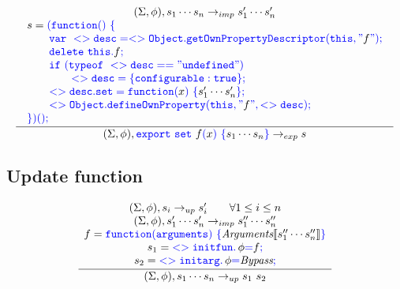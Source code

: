 \documentclass[a4paper]{article}
\newcommand{\code}[1]{\textcolor{blue}{\tt #1}}
\newcommand{\mydot}{.\,}
\begin{document}
\begin{equation*}
\frac{
    \begin{array}{c}
    (\Sigma, \phi), s_1 \cdots s_n \rightarrow_{imp} s'_1 \cdots s'_n \\
    \begin{array}{l}
    s = \code{(} \code{function()}\ \code{\{} \\
    \qquad \code{var\ <>desc = <>Object.getOwnPropertyDescriptor(this, "}f\code{");} \\
    \qquad \code{delete\ this.}f\code{;} \\
    \qquad \code{if\ (typeof\ <>desc == "undefined")} \\
    \qquad\qquad \code{<>desc = \{ configurable: true \};} \\
    \qquad \code{<>desc.set = function(}x\code{)}\ \code{\{} s'_1 \cdots s'_n \code{\};} \\
    \qquad \code{<>Object.defineOwnProperty(this, "}f\code{", <>desc);} \\
    \code{\}} \code{)} \code{();} \\
    \end{array} \\
    \end{array}
}{
    (\Sigma, \phi), \code{export}\ \code{set}\ f\code{(}x\code{)}\ \code{\{} s_1 \cdots s_n \code{\}} \rightarrow_{exp} s
}
\end{equation*}

\subsection{Update function}
\begin{equation*}
\frac{
    \begin{array}{c}
    (\Sigma, \phi), s_i \rightarrow_{up} s'_i \qquad \forall 1 \le i \le n \\
    (\Sigma, \phi), s'_1 \cdots s'_n \rightarrow_{imp} s''_1 \cdots s''_n \\
    f = \code{function(arguments)}\ \code{\{} \emph{Arguments} \llbracket s''_1 \cdots s''_n \rrbracket \code{\}} \\
    s_1 = \code{<>initfun \mydot} \phi \code{=} f \code{;} \\
    s_2 = \code{<>initarg \mydot} \phi \code{=} \emph{Bypass}\code{;} \\
    \end{array}
}{
    (\Sigma, \phi), s_1 \cdots s_n \rightarrow_{up} s_1\ s_2
}
\end{equation*}
\end{document}
